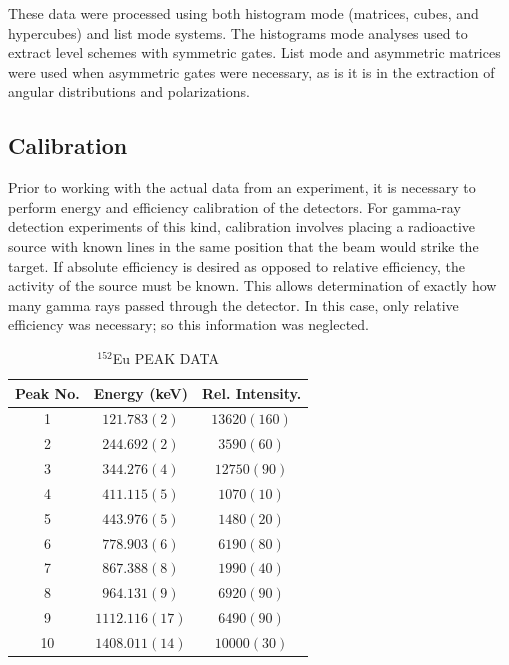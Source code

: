 These data were processed using both histogram mode (matrices, cubes, and hypercubes)\cite{radware} and list mode\cite{ROOT,blue} systems. The histograms mode analyses used to extract level schemes with symmetric gates. List mode and asymmetric matrices were used when asymmetric gates were necessary, as is it is in the extraction of angular distributions and polarizations.
 
\subsection{Calibration}
\label{ssec:exp-pr-data-proc-cal}
Prior to working with the actual data from an experiment, it is necessary to perform energy and efficiency calibration of the detectors. For gamma-ray detection experiments of this kind, calibration involves placing a radioactive source with known lines in the same position that the beam would strike the target. If absolute efficiency is desired as opposed to relative efficiency, the activity of the source must be known. This allows determination of exactly how many gamma rays passed through the detector. In this case, only relative efficiency was necessary; so this information was neglected.

\begin{table}[hT!]
\caption{$^{152}$Eu PEAK DATA \label{tbl:152Eu-peaks}}
\begin{center}
\begin{tabular}{ccc}
\toprule
Peak No. & Energy (keV) & Rel. Intensity. \\ 
\midrule
1 & $121.783(2)$ & $13620(160)$ \\ 
2 & $244.692(2)$ & $3590(60)$ \\ 
3 & $344.276(4)$ & $12750(90)$ \\ 
4 & $411.115(5)$ & $1070(10)$ \\ 
5 & $443.976(5)$ & $1480(20)$ \\ 
6 & $778.903(6)$ & $6190(80)$ \\ 
7 & $867.388(8)$ & $1990(40)$ \\ 
8 & $964.131(9)$ & $6920(90)$ \\ 
9 & $1112.116(17)$ & $6490(90)$ \\ 
10 & $1408.011(14)$ & $10000(30)$ \\ 
\bottomrule
\end{tabular} 
\end{center}
\end{table}

